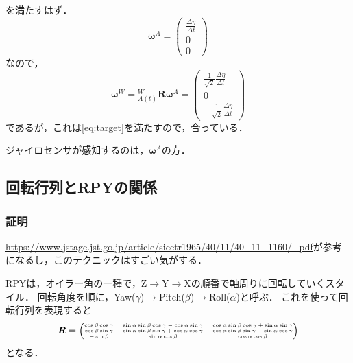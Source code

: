 を満たすはず．
\begin{equation}
  \boldsymbol{\omega}^{A} = \begin{pmatrix}
    \frac{\Delta \eta}{\Delta t}\\
    0\\
    0
  \end{pmatrix}
\end{equation}
なので，
\begin{equation}
  \boldsymbol{\omega}^{W} = {}^{W}_{A(t)}\boldsymbol{R} \boldsymbol{\omega}^{A} = \begin{pmatrix}
    \frac{1}{\sqrt{2}} \frac{\Delta \eta}{\Delta t}\\
    0\\
    -\frac{1}{\sqrt{2}} \frac{\Delta \eta}{\Delta t}
  \end{pmatrix}
\end{equation}
であるが，これは\autoref{eq:target}を満たすので，合っている．

ジャイロセンサが感知するのは，$\boldsymbol{\omega}^{A}$の方．

\subsection{回転行列とRPYの関係}\label{subsec:rpy}
\subsubsection{証明}
\url{https://www.jstage.jst.go.jp/article/sicetr1965/40/11/40_11_1160/_pdf}が参考になるし，このテクニックはすごい気がする．

RPYは，オイラー角の一種で，Z$\to$Y$\to$Xの順番で軸周りに回転していくスタイル．
回転角度を順に，Yaw($\gamma$)$\to$Pitch($\beta$)$\to$Roll($\alpha$)と呼ぶ．
これを使って回転行列を表現すると
\begin{equation}
  \boldsymbol{R} = {\tiny \begin{pmatrix}
      \cos \beta \cos \gamma & \sin \alpha \sin \beta \cos \gamma - \cos \alpha \sin \gamma & \cos \alpha \sin \beta \cos \gamma + \sin \alpha \sin \gamma \\
      \cos \beta \sin \gamma & \sin \alpha \sin \beta \sin \gamma + \cos \alpha \cos \gamma & \cos \alpha \sin \beta \sin \gamma - \sin \alpha \cos \gamma \\
      -\sin \beta & \sin \alpha \cos \beta & \cos \alpha \cos \beta
  \end{pmatrix}}
\end{equation}
となる．

